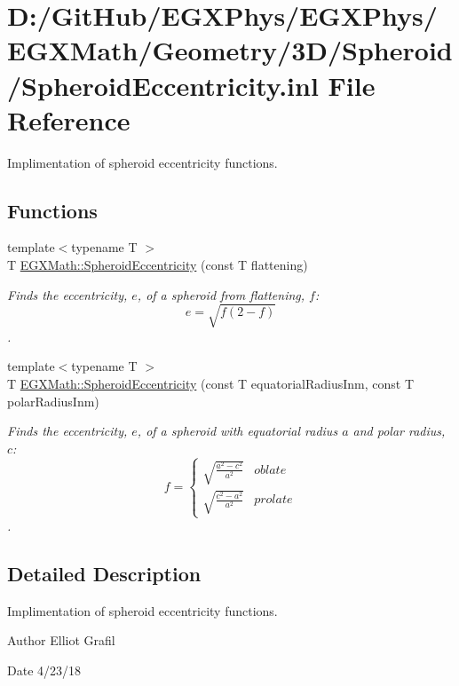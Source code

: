 \hypertarget{_spheroid_eccentricity_8inl}{}\section{D\+:/\+Git\+Hub/\+E\+G\+X\+Phys/\+E\+G\+X\+Phys/\+E\+G\+X\+Math/\+Geometry/3\+D/\+Spheroid/\+Spheroid\+Eccentricity.inl File Reference}
\label{_spheroid_eccentricity_8inl}


Implimentation of spheroid eccentricity functions.  


\subsection*{Functions}
\begin{DoxyCompactItemize}
\item 
{\footnotesize template$<$typename T $>$ }\\T \mbox{\hyperlink{group___e_g_x_math-_geometry-3_d-_spheroid-_eccentricity_gab45680528a41bb7a5e15ddc0059156dd}{E\+G\+X\+Math\+::\+Spheroid\+Eccentricity}} (const T flattening)
\begin{DoxyCompactList}\small\item\em Finds the eccentricity, $e$, of a spheroid from flattening, $f$\+: \[ e = \sqrt{f (2 - f)} \]. \end{DoxyCompactList}\item 
{\footnotesize template$<$typename T $>$ }\\T \mbox{\hyperlink{group___e_g_x_math-_geometry-3_d-_spheroid-_eccentricity_ga0b6ce84e9c4c2fd5bc5a29569c2c2295}{E\+G\+X\+Math\+::\+Spheroid\+Eccentricity}} (const T equatorial\+Radius\+Inm, const T polar\+Radius\+Inm)
\begin{DoxyCompactList}\small\item\em Finds the eccentricity, $e$, of a spheroid with equatorial radius $a$ and polar radius, $c$\+: \[ f =\begin{cases} \sqrt{\frac{a^2-c^2}{a^2}} & oblate \\ \sqrt{\frac{c^2-a^2}{a^2}} & prolate \end{cases} \]. \end{DoxyCompactList}\end{DoxyCompactItemize}


\subsection{Detailed Description}
Implimentation of spheroid eccentricity functions. 

\begin{DoxyAuthor}{Author}
Elliot Grafil 
\end{DoxyAuthor}
\begin{DoxyDate}{Date}
4/23/18 
\end{DoxyDate}
